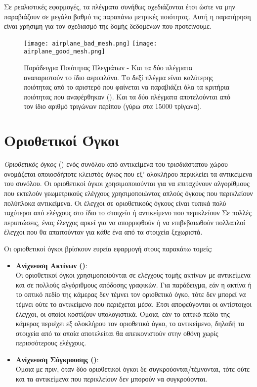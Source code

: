 Σε ρεαλιστικές εφαρμογές, τα πλέγματα συνήθως σχεδιάζονται έτσι ώστε 
να μην παραβιάζουν σε μεγάλο βαθμό τις παραπάνω μετρικές ποιότητας.
Αυτή η παρατήρηση είναι χρήσιμη για τον σχεδιασμό της δομής δεδομένων 
που προτείνουμε.

\begin{figure}[h]
    \centering
    \texttt{[image: airplane\_bad\_mesh.png]}
    \texttt{[image: airplane\_good\_mesh.png]}
    \caption[Παράδειγμα Ποιότητας Πλεγμάτων]{
        Παράδειγμα Ποιότητας Πλεγμάτων - Και τα δύο πλέγματα 
        αναπαριστούν το ίδιο αεροπλάνο. Το δεξί πλέγμα είναι 
        καλύτερης ποιότητας από το αριστερό που φαίνεται να 
        παραβιάζει όλα τα κριτήρια ποιότητας που αναφέρθηκαν
        (). Και τα 
        δύο πλέγματα αποτελούνται από τον ίδιο αριθμό τριγώνων
        περίπου (γύρω στα $15000$ τρίγωνα).
    }
\end{figure}

\section{Οριοθετικοί Όγκοι}
\label{sec:bounding_volumes}
\textit{Οριοθετικός όγκος} (\textbf{}) ενός συνόλου 
από αντικείμενα του τρισδιάστατου χώρου ονομάζεται οποιοσδήποτε 
κλειστός όγκος που εξ' ολοκλήρου περικλείει τα αντικείμενα του συνόλου. 
Οι οριοθετικοί όγκοι χρησιμοποιούνται για να επιταχύνουν αλγορίθμους   
που εκτελούν γεωμετρικούς ελέγχους χρησιμοποιώντας απλούς όγκους 
που περικλείουν πολύπλοκα αντικείμενα.
Οι έλεγχοι σε οριοθετικούς όγκους είναι τυπικά πολύ ταχύτεροι από 
ελέγχους στο ίδιο το στοιχείο ή αντικείμενο που περικλείουν 
Σε πολλές περιπτώσεις, ένας έλεγχος αρκεί για να απορριφθούν ή 
να επιβεβαιωθούν πολλαπλοί έλεγχοι που θα απαιτούνταν για κάθε ένα 
από τα στοιχεία ξεχωριστά.

Οι οριοθετικοί όγκοι βρίσκουν ευρεία εφαρμογή στους παρακάτω τομείς:
\begin{itemize}
    \item \textbf{Ανίχνευση Ακτίνων ()}:\\
    Oι οριοθετικοί όγκοι χρησιμοποιούνται σε ελέγχους τομής ακτίνων 
    με αντικείμενα και σε πολλούς αλγόριθμους απόδοσης γραφικών.
    Για παράδειγμα, εάν η ακτίνα ή το οπτικό πεδίο της κάμερας
    δεν τέμνει τον οριοθετικό όγκο, τότε δεν μπορεί να τέμνει ούτε 
    το αντικείμενο που περιέχεται μέσα. Έτσι αποφεύγονται οι 
    αντίστοιχοι έλεγχοι, οι οποίοι κοστίζουν υπολογιστικά.
    Όμοια, εάν το οπτικό πεδίο της κάμερας περιέχει εξ ολοκλήρου 
    τον οριοθετικό όγκο, το αντικείμενο, δηλαδή τα στοιχεία από τα
    οποία αποτελείται θα απεικονιστούν στην 
    οθόνη χωρίς περισσότερους ελέγχους. 
    
    \item \textbf{Ανίχνευση Σύγκρουσης ()}:\\
    Όμοια με πριν, όταν δύο οριοθετικοί όγκοι δε συγκρούονται/τέμνονται, 
    τότε ούτε και τα αντικείμενα που περικλείουν δεν μπορούν να συγκρούονται.
\end{itemize}

